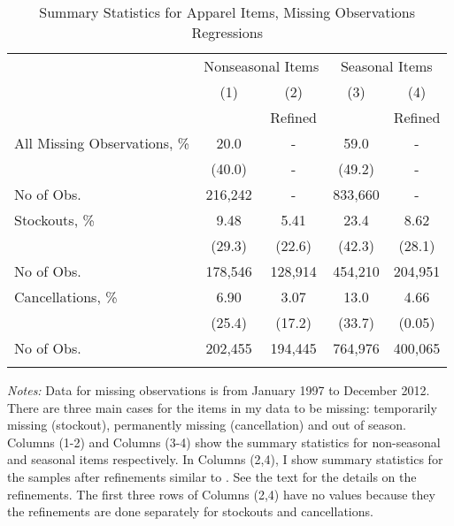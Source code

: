 \documentclass[12pt]{article}
\begin{document}
	\begin{table}
		\caption{Summary Statistics for Apparel Items, Missing Observations Regressions}
		\label{table:summis}
		\centering
		\begin{threeparttable}
			\begin{tabular}{lcccc}
				\hline \noalign{\smallskip} & \multicolumn{2}{c}{Nonseasonal Items} & \multicolumn{2}{c}{Seasonal Items} \\
				\noalign{\smallskip}\hline \noalign{\smallskip}			
				& (1) & (2) & (3) & (4) \\
				&  & Refined & & Refined \\
				All Missing Observations, \% 	& 20.0 		& 	-		& 	59.0	& 	-	\\
				& (40.0) 	& 	-		& 	(49.2)	&  	-	\\	
				No of Obs. 						& 216,242 	&  	-		& 833,660 	&  	-	\\
				
				Stockouts, 	\% 					& 9.48 		& 5.41 		& 23.4 		& 8.62 \\
				& (29.3) 	& (22.6) 	& (42.3) 	& (28.1) \\
				No of Obs.  					& 178,546 	& 128,914 	& 454,210 	& 204,951 \\
				
				Cancellations, \% 				& 6.90 		& 3.07 		& 13.0 		& 4.66 \\
				& (25.4) 	& (17.2) 	& (33.7) 	& (0.05) \\
				No of Obs. 						& 202,455 	& 194,445	& 764,976 	& 400,065 \\
				\noalign{\smallskip}\hline
			\end{tabular}
			\begin{tablenotes}
				\small \emph{Notes:} Data for missing observations is from January 1997 to December 2012. There are three main cases for the items in my data to be missing: temporarily missing (stockout), permanently missing (cancellation) and out of season. Columns (1-2) and Columns (3-4) show the summary statistics for non-seasonal and seasonal items respectively. In Columns (2,4), I show summary statistics for the samples after refinements similar to \citet{matsa}. See the text for the details on the refinements. The first three rows of Columns (2,4) have no values because they the refinements are done separately for stockouts and cancellations.
			\end{tablenotes}
		\end{threeparttable}
	\end{table}
	
\end{document}
